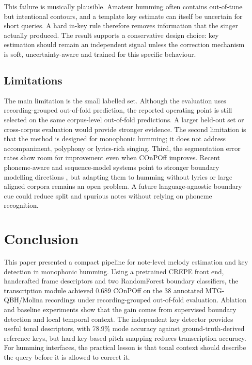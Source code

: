 \documentclass[pdflatex,sn-mathphys-num]{sn-jnl}
\begin{document}
This failure is musically plausible. Amateur humming often contains out-of-tune but intentional contours, and a template key estimate can itself be uncertain for short queries. A hard in-key rule therefore removes information that the singer actually produced. The result supports a conservative design choice: key estimation should remain an independent signal unless the correction mechanism is soft, uncertainty-aware and trained for this specific behaviour.

\subsection{Limitations}

The main limitation is the small labelled set. Although the evaluation uses recording-grouped out-of-fold prediction, the reported operating point is still selected on the same corpus-level out-of-fold predictions. A larger held-out set or cross-corpus evaluation would provide stronger evidence. The second limitation is that the method is designed for monophonic humming; it does not address accompaniment, polyphony or lyrics-rich singing. Third, the segmentation error rates show room for improvement even when COnPOff improves. Recent phoneme-aware and sequence-model systems point to stronger boundary modelling directions \cite{yong2023phoneme,li2024rosvot,guo2025stars}, but adapting them to humming without lyrics or large aligned corpora remains an open problem. A future language-agnostic boundary cue could reduce split and spurious notes without relying on phoneme recognition.

\section{Conclusion}\label{sec:conclusion}

This paper presented a compact pipeline for note-level melody estimation and key detection in monophonic humming. Using a pretrained CREPE front end, handcrafted frame descriptors and two RandomForest boundary classifiers, the transcription module achieved 0.689 COnPOff on the 38 annotated MTG-QBH/Molina recordings under recording-grouped out-of-fold evaluation. Ablation and baseline experiments show that the gain comes from supervised boundary detection and local temporal context. The independent key detector provides useful tonal descriptors, with 78.9\% mode accuracy against ground-truth-derived reference keys, but hard key-based pitch snapping reduces transcription accuracy. For humming interfaces, the practical lesson is that tonal context should describe the query before it is allowed to correct it.
\end{document}
